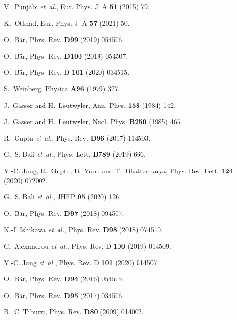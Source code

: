 \documentclass[11pt,prd,aps,showpacs,eqsecnum,floatfix,nofootinbib,preprint,tightenlines]{revtex4}
\begin{document}
\begin{thebibliography}{10}

V.~Punjabi {\em et~al.},
\newblock Eur. Phys. J. A {\bf 51} (2015) 79.

K.~Ottnad,
\newblock Eur. Phys. J. A {\bf 57} (2021) 50.

O.~B{\"a}r,
\newblock Phys. Rev. {\bf D99} (2019) 054506.

O.~B{\"a}r,
\newblock Phys. Rev. {\bf D100} (2019) 054507.

O.~B{\"a}r,
\newblock Phys. Rev. D {\bf 101} (2020) 034515.

S.~Weinberg,
\newblock Physica {\bf A96} (1979) 327.

J.~Gasser and H.~Leutwyler,
\newblock Ann. Phys. {\bf 158} (1984) 142.

J.~Gasser and H.~Leutwyler,
\newblock Nucl. Phys. {\bf B250} (1985) 465.

R.~Gupta {\em et~al.},
\newblock Phys. Rev. {\bf D96} (2017) 114503.

G.~S. Bali {\em et~al.},
\newblock Phys. Lett. {\bf B789} (2019) 666.

Y.-C. Jang, R.~Gupta, B.~Yoon and T.~Bhattacharya,
\newblock Phys. Rev. Lett. {\bf 124} (2020) 072002.

G.~S. Bali {\em et~al.},
\newblock JHEP {\bf 05} (2020) 126.

O.~B{\"a}r,
\newblock Phys. Rev. {\bf D97} (2018) 094507.

K.-I. Ishikawa {\em et~al.},
\newblock Phys. Rev. {\bf D98} (2018) 074510.

C.~Alexandrou {\em et~al.},
\newblock Phys. Rev. D {\bf 100} (2019) 014509.

Y.-C. Jang {\em et~al.},
\newblock Phys. Rev. D {\bf 101} (2020) 014507.

O.~B{\"a}r,
\newblock Phys. Rev. {\bf D94} (2016) 054505.

O.~B{\"a}r,
\newblock Phys. Rev. {\bf D95} (2017) 034506.

B.~C. Tiburzi,
\newblock Phys. Rev. {\bf D80} (2009) 014002.


\end{thebibliography}
\end{document}
